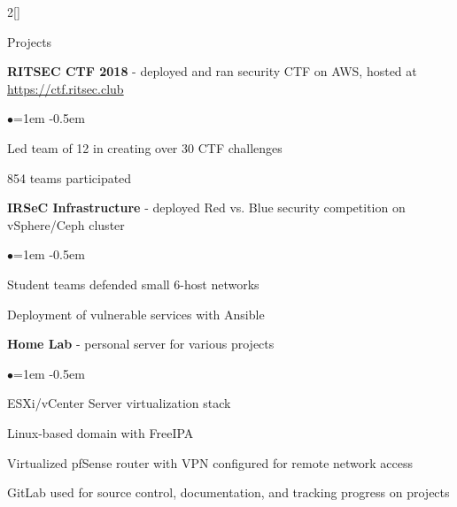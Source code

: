 \documentclass[8pt]{resume} %
\begin{document}
\begin{multicols}{2}[]


\begin{rSection}{Projects}

    {\bf RITSEC CTF 2018} - deployed and ran security CTF on AWS, hosted at
    \url{https://ctf.ritsec.club}
    \begin{list}{$\bullet$}{\leftmargin=1em}
    \itemsep -0.5em \vspace{-0.5em}
        \item Led team of 12 in creating over 30 CTF challenges
        \item 854 teams participated
    \end{list}


    {\bf IRSeC Infrastructure} - deployed Red vs. Blue security competition on
    vSphere/Ceph cluster
    \begin{list}{$\bullet$}{\leftmargin=1em}
    \itemsep -0.5em \vspace{-0.5em}
        \item Student teams defended small 6-host networks
        \item Deployment of vulnerable services with Ansible
    \end{list}


    {\bf Home Lab} - personal server for various projects
    \begin{list}{$\bullet$}{\leftmargin=1em}
    \itemsep -0.5em \vspace{-0.5em}
        \item ESXi/vCenter Server virtualization stack
        \item Linux-based domain with FreeIPA
        \item Virtualized pfSense router with VPN configured for remote network
            access
        \item GitLab used for source control, documentation, and tracking
            progress on projects
    \end{list}

\end{rSection}


\end{multicols}
\end{document}
